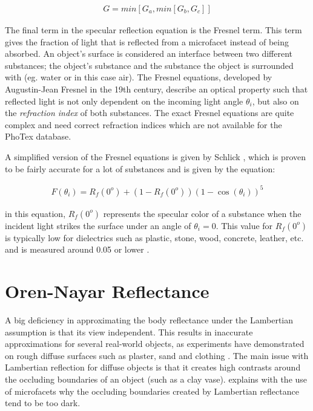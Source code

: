 	\begin{eqnarray*}
		G = min \left[ {G_a, min \left[ {G_b, G_c} \right] } \right]
	\end{eqnarray*}

\noindent The final term in the specular reflection equation is the Fresnel term. This term gives the fraction of light that is reflected from a microfacet instead of being absorbed. An object's surface is considered an interface between two different substances; the object's substance and the substance the object is surrounded with (eg. water or in this case air). The Fresnel equations, developed by Augustin-Jean Fresnel in the 19th century, describe an optical property such that reflected light is not only dependent on the incoming light angle $\theta_i$, but also on the \textit{refraction index} of both substances. The exact Fresnel equations are quite complex and need correct refraction indices which are not available for the PhoTex database. 

A simplified version of the Fresnel equations is given by Schlick \cite{Schlick}, which is proven to be fairly accurate for a lot of substances and is given by the equation:

	\begin{eqnarray*}
		F(\theta_i) = R_f(0^o) + (1 - R_f(0^o))(1 - \cos(\theta_i))^5
	\end{eqnarray*}

\noindent in this equation, $R_f(0^o)$ represents the specular color of a substance when the incident light strikes the surface under an angle of $\theta_i = 0$. This value for $R_f(0^o)$ is typically low for dielectrics such as plastic, stone, wood, concrete, leather, etc. and is measured around 0.05 or lower \cite{RTR}. 


\section{Oren-Nayar Reflectance}\label{sec:OrenNayar}
A big deficiency in approximating the body reflectance under the Lambertian assumption is that its view independent. This results in inaccurate approximations for several real-world objects, as experiments have demonstrated on rough diffuse surfaces such as plaster, sand and clothing \cite{OrenNayar}. The main issue with Lambertian reflection for diffuse objects is that it creates high contrasts around the occluding boundaries of an object (such as a clay vase).  explains with the use of microfacets why the occluding boundaries created by Lambertian reflectance tend to be too dark.

